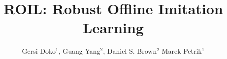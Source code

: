 \documentclass[final,a0paper]{beamer}
\title{ROIL\@: Robust Offline Imitation Learning}
\author[]{Gersi Doko$^{1}$, Guang Yang$^{2}$, Daniel S. Brown$^{2}$ Marek Petrik$^{1}$}
\institute{$^{1}$University of New Hampshire, $^{2}$University of Utah}
\begin{document}
\begin{frame}{}
\vspace{-2cm}
\begin{columns}[t]
  \begin{column}{0.3\linewidth}
    
    
  \end{column}
  
  \begin{column}{0.3\linewidth}
    
    
    
  \end{column}

  \begin{column}{0.3\linewidth}
    
  \end{column}
\end{columns}
\end{frame}
\end{document}
